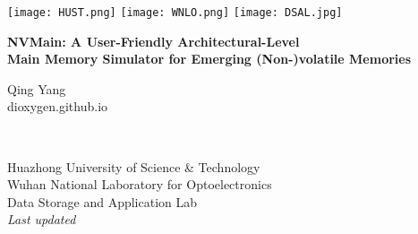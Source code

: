 \documentclass[11pt,fleqn]{book} %
\begin{document}
\let\cleardoublepage\clearpage


\begingroup
\thispagestyle{empty}
\texttt{[image: HUST.png]}
\texttt{[image: WNLO.png]}
\texttt{[image: DSAL.jpg]}
\centering
\vspace*{5cm}
\par\normalfont\fontsize{32}{32}\sffamily\selectfont
\textbf{NVMain: A User-Friendly Architectural-Level\\ Main Memory Simulator for Emerging (Non-)volatile Memories}\\
{\LARGE }\par %
\vspace*{1cm}
{\Huge Qing Yang\\dioxygen.github.io}\par %
\endgroup


\newpage
~\vfill
\thispagestyle{empty}


\noindent Huazhong University of Science \& Technology\\

\noindent Wuhan National Laboratory for Optoelectronics\\

\noindent Data Storage and Application Lab\\

\noindent \textit{Last updated } %
\filemodprint{\jobname}



\pagestyle{empty} %
\end{document}
